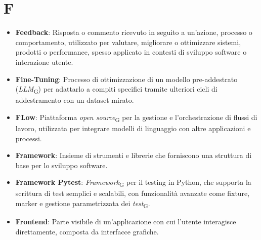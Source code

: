 \section{F}
\begin{itemize}
    \item \textbf{Feedback}: Risposta o commento ricevuto in seguito a un'azione, processo o comportamento, utilizzato per valutare, migliorare o ottimizzare sistemi, prodotti o performance, spesso applicato in contesti di sviluppo software o interazione utente.
    \item \textbf{Fine-Tuning}: Processo di ottimizzazione di un modello pre-addestrato (\textit{LLM}\textsubscript{G}) per adattarlo a compiti specifici tramite ulteriori cicli di addestramento con un dataset mirato.
    \item \textbf{FLow}: Piattaforma \textit{open source}\textsubscript{G} per la gestione e l'orchestrazione di flussi di lavoro, utilizzata per integrare modelli di linguaggio con altre applicazioni e processi.
    \item \textbf{Framework}: Insieme di strumenti e librerie che forniscono una struttura di base per lo sviluppo software.
    \item \textbf{Framework Pytest}:  \textit{Framework}\textsubscript{G} per il testing in Python, che supporta la scrittura di test semplici e scalabili, con funzionalità avanzate come fixture, marker e gestione parametrizzata dei \textit{test}\textsubscript{G}.
    
    \item \textbf{Frontend}: Parte visibile di un'applicazione con cui l'utente interagisce direttamente, composta da interfacce grafiche.
\end{itemize}
